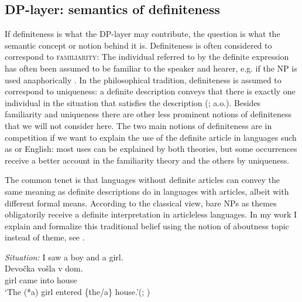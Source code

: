 \documentclass[output=paper]{langscibook}
\begin{document}
\subsection{DP-layer: semantics of definiteness}

If definiteness is what the DP-layer may contribute, the question is what the semantic concept or notion behind it is. Definiteness is often considered to correspond to \textsc{familiarity}:  The individual referred to by the definite expression has often been assumed to be familiar to the speaker and hearer, e.g. if the NP is used anaphorically \citep{Christophersen1939,Heim1982}. In the philosophical tradition, definiteness is assumed to correspond to uniqueness: a definite description conveys that there is exactly one individual in the situation that satisfies the description (\citealt{Chierchia1998,Dayal2004}; a.o.). Besides familiarity and uniqueness there are other less prominent notions of definiteness that we will not consider here. The two main notions of definiteness are in competition if we want to explain the use of the definite article in languages such as  or English: most uses can be explained by both theories, but some occurrences receive a better account in the familiarity theory and the others by uniqueness.

The common tenet is that languages without definite articles can convey the same meaning as definite descriptions do in languages with articles, albeit with different formal means. According to the classical view, bare NPs as themes obligatorily receive a definite interpretation in articleless  languages. In my work \citet{Geist2010} I explain and formalize this traditional belief using the notion of aboutness topic instead of theme, see .


\ea \label{ex:9} \textit{Situation:} I saw a boy and a girl.\\
\gll Devočka	 vošla   	v     dom. \\
    girl  came  	into house\\
\glt `The (*a) girl entered \{the/a\} house.'\hfill (; \citealt[193]{Geist2010})
\z
\end{document}
